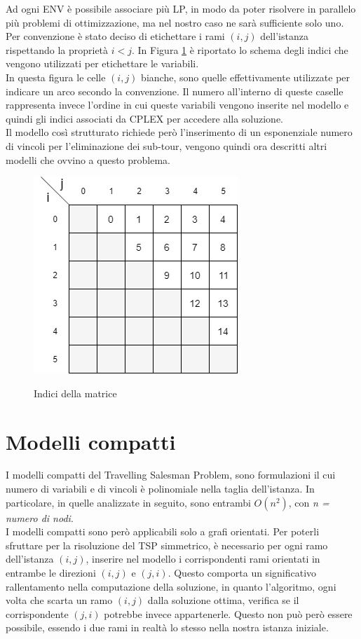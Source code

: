 Ad ogni ENV è possibile associare più LP, in modo da poter risolvere in parallelo più problemi di ottimizzazione, ma nel nostro caso ne sarà sufficiente solo uno.\\
Per convenzione è stato deciso di etichettare i rami $(i,j)$ dell'istanza rispettando la proprietà $i<j$. In Figura \ref{Indici_matrice} è riportato lo schema degli indici che vengono utilizzati per etichettare le variabili.\\
In questa figura le celle $(i,j)$ bianche, sono quelle effettivamente utilizzate per indicare un arco secondo la convenzione. Il numero all'interno di queste caselle rappresenta invece l'ordine in cui queste variabili vengono inserite nel modello e quindi gli indici associati da CPLEX per accedere alla soluzione.\\Il modello così strutturato richiede però l'inserimento di un esponenziale numero di vincoli per l'eliminazione dei sub-tour, vengono quindi ora descritti altri modelli che ovvino a questo problema.
\begin{figure}[h] 
\begin{center} 
  \includegraphics[scale=0.5]{Images/indices_matrix}\\ 
  \caption{\footnotesize{Indici della matrice}}
  \label{Indici_matrice} 
\end{center} 
\end{figure}  

\section{Modelli compatti}
I modelli compatti del Travelling Salesman Problem, sono formulazioni il cui numero di variabili e di vincoli è polinomiale nella taglia dell'istanza. In particolare, in quelle analizzate in seguito, sono entrambi $O(n^2)$, con \textit{n = numero di nodi}.\\
I modelli compatti sono però applicabili solo a grafi orientati. Per poterli sfruttare per la risoluzione del TSP simmetrico, è necessario per ogni ramo dell'istanza $(i,j)$, inserire nel modello i corrispondenti rami orientati in entrambe le direzioni $(i,j)$ e $(j,i)$. Questo comporta un significativo rallentamento nella computazione della soluzione, in quanto l'algoritmo, ogni volta che scarta un ramo $(i,j)$ dalla soluzione ottima, verifica se il corrispondente $(j,i)$ potrebbe invece appartenerle. Questo non può però essere possibile, essendo i due rami in realtà lo stesso nella nostra istanza iniziale.\\ 
